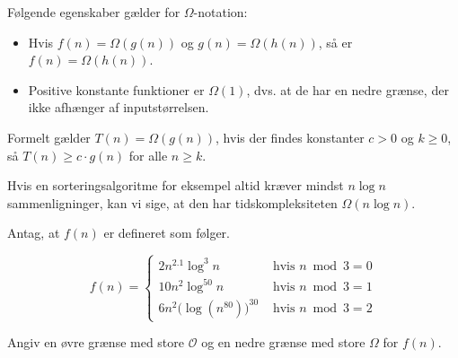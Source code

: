 Følgende egenskaber gælder for $\Omega$-notation:
\begin{itemize}
    \item Hvis $f(n) = \Omega(g(n))$ og $g(n) = \Omega(h(n))$, så er $f(n) = \Omega(h(n))$.
    \item Positive konstante funktioner er $\Omega(1)$, dvs. at de har en nedre grænse, der ikke afhænger af inputstørrelsen.
\end{itemize}


Formelt gælder $T(n) = \Omega(g(n))$, hvis der findes konstanter $c > 0$ og $k \geq 0$, så $T(n) \geq c \cdot g(n)$ for alle $n \geq k$.

Hvis en sorteringsalgoritme for eksempel altid kræver mindst $n \log n$ sammenligninger, kan vi sige, at den har tidskompleksiteten $\Omega(n \log n)$.

\begin{example}

    Antag, at $f(n)$ er defineret som følger.
    
    \[
    f(n)= \begin{cases}2 n^{2.1} \log ^3 n & \text { hvis } n \bmod 3=0 \\ 10 n^2 \log ^{50} n & \text { hvis } n \bmod 3=1 \\ 6 n^2 \bigl(\log(n^{80})\bigr)^{30} & \text { hvis } n \bmod 3=2\end{cases}
    \]
    
    
    Angiv en øvre grænse med store $\mathcal{O}$ og en nedre grænse med store $\Omega$ for $f(n)$.
    \end{example}
    
